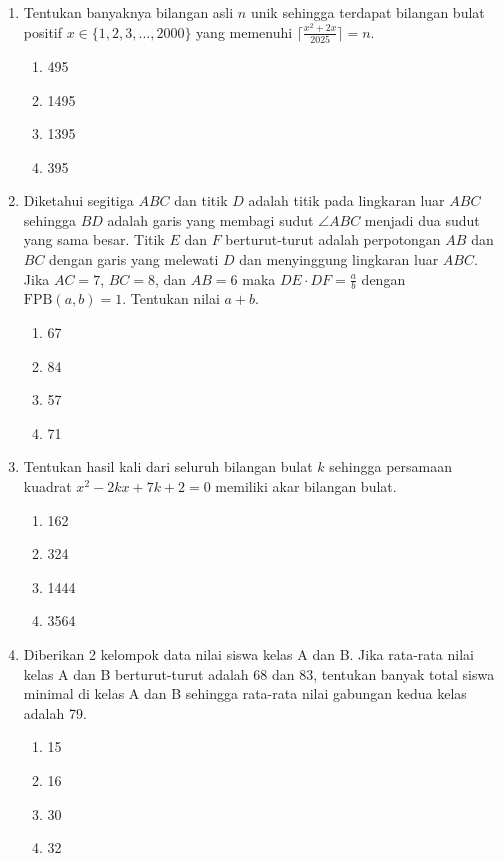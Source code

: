 \documentclass[12pt]{article}
\begin{document}
\begin{enumerate}
    \item Tentukan banyaknya bilangan asli $n$ unik sehingga terdapat bilangan bulat positif $x \in \{1,2,3,\dots,2000\}$ yang memenuhi $\lceil\frac{x^{2}+2x}{2025}\rceil=n$.
    \begin{enumerate}
        \item 495
        \item 1495
        \item 1395
        \item 395
    \end{enumerate}

    \item Diketahui segitiga $ABC$ dan titik $D$ adalah titik pada lingkaran luar $ABC$ sehingga $BD$ adalah garis yang membagi sudut $\angle ABC$ menjadi dua sudut yang sama besar. Titik $E$ dan $F$ berturut-turut adalah perpotongan $AB$ dan $BC$ dengan garis yang melewati $D$ dan menyinggung lingkaran luar $ABC$. Jika $AC=7$, $BC=8$, dan $AB=6$ maka $DE \cdot DF=\frac{a}{b}$ dengan $\text{FPB}(a,b)=1$. Tentukan nilai $a+b$.
    \begin{enumerate}
        \item 67
        \item 84
        \item 57
        \item 71
    \end{enumerate}

    \item Tentukan hasil kali dari seluruh bilangan bulat $k$ sehingga persamaan kuadrat $x^{2}-2kx+7k+2=0$ memiliki akar bilangan bulat.
    \begin{enumerate}
        \item 162
        \item 324
        \item 1444
        \item 3564
    \end{enumerate}

    \item Diberikan 2 kelompok data nilai siswa kelas A dan B. Jika rata-rata nilai kelas A dan B berturut-turut adalah 68 dan 83, tentukan banyak total siswa minimal di kelas A dan B sehingga rata-rata nilai gabungan kedua kelas adalah 79.
    \begin{enumerate}
        \item 15
        \item 16
        \item 30
        \item 32
    \end{enumerate}


\end{enumerate}
\end{document}
